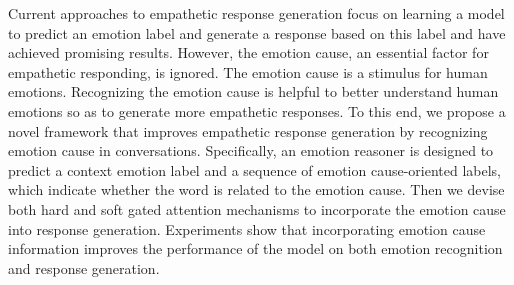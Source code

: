 Current approaches to empathetic response generation focus on learning a model to predict an emotion label and generate a response based on this label and have achieved promising results. However, the emotion cause, an essential factor for empathetic responding, is ignored. The emotion cause is a stimulus for human emotions. Recognizing the emotion cause is helpful to better understand human emotions so as to generate more empathetic responses. To this end, we propose a novel framework that improves empathetic response generation by recognizing emotion cause in conversations. Specifically, an emotion reasoner is designed to predict a context emotion label and a sequence of emotion cause-oriented labels, which indicate whether the word is related to the emotion cause. Then we devise both hard and soft gated attention mechanisms to incorporate the emotion cause into response generation. Experiments show that incorporating emotion cause information improves the performance of the model on both emotion recognition and response generation.
